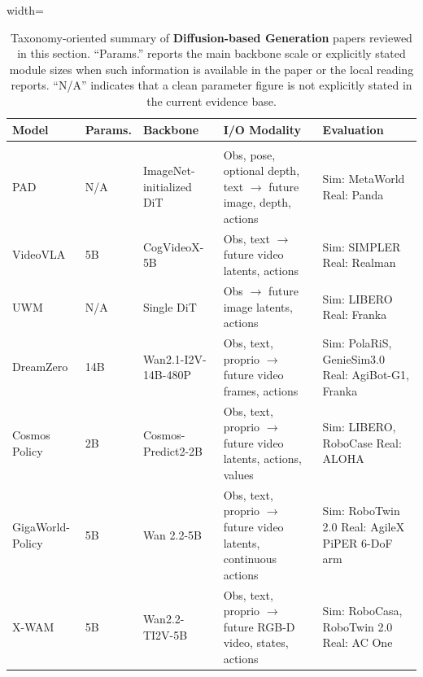 \begin{table}[!ht]
\centering
\scriptsize
\setlength{\tabcolsep}{3.5pt}
\renewcommand{\arraystretch}{1.08}
\caption{Taxonomy-oriented summary of \textbf{Diffusion-based Generation} papers reviewed in this section. ``Params.'' reports the main backbone scale or explicitly stated module sizes when such information is available in the paper or the local reading reports. ``N/A'' indicates that a clean parameter figure is not explicitly stated in the current evidence base.}
\label{tab:continuous_diffusion_joint_prediction_summary}

\begin{adjustbox}{width=\linewidth}
\begin{threeparttable}
\begin{tabular}{
  l
  >{\RaggedRight\arraybackslash}p{1.20cm}
  >{\RaggedRight\arraybackslash}p{3.00cm}
  >{\RaggedRight\arraybackslash}p{5.00cm}
  >{\RaggedRight\arraybackslash}p{5.0cm}
}
\toprule
\textbf{Model} &
\textbf{Params.} &
\textbf{Backbone} &
\textbf{I/O Modality} &
\textbf{Evaluation} \\
\midrule

\rowcolor{gray!12}
\multicolumn{5}{l}{\textbf{Unified Stream: Explicit Future Prediction}} \\
\midrule
PAD \cite{PAD}
  & N/A
  & ImageNet-initialized DiT
  & Obs, pose, optional depth, text $\rightarrow$ future image, depth, actions
  & Sim: MetaWorld \newline Real: Panda \\
VideoVLA \cite{VideoVLA}
  & 5B
  & CogVideoX-5B
  & Obs, text $\rightarrow$ future video latents, actions
  & Sim: SIMPLER \newline Real: Realman \\
UWM \cite{UWM}
  & N/A
  & Single DiT
  & Obs $\rightarrow$ future image latents, actions
  & Sim: LIBERO \newline Real: Franka \\
DreamZero \cite{DreamZero}
  & 14B
  & Wan2.1-I2V-14B-480P
  & Obs, text, proprio $\rightarrow$ future video frames, actions
  & Sim: PolaRiS, GenieSim3.0 \newline Real: AgiBot-G1, Franka \\
Cosmos Policy \cite{CosmosPolicy}
  & 2B
  & Cosmos-Predict2-2B
  & Obs, text, proprio $\rightarrow$ future video latents, actions, values
  & Sim: LIBERO, RoboCase \newline Real: ALOHA \\
GigaWorld-Policy \cite{gigaworld-policy}
  & 5B
  & Wan 2.2-5B
  & Obs, text, proprio $\rightarrow$ future video latents, continuous actions
  & Sim: RoboTwin 2.0 \newline Real: AgileX PiPER 6-DoF arm \\
X-WAM \cite{guo2026xwam}
  & 5B
  & Wan2.2-TI2V-5B
  & Obs, text, proprio $\rightarrow$ future RGB-D video, states, actions
  & Sim: RoboCasa, RoboTwin 2.0 \newline Real: AC One \\
\midrule


\end{tabular}
\end{threeparttable}
\end{adjustbox}
\end{table}
